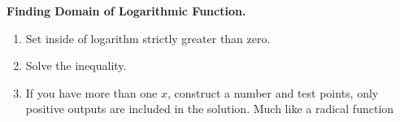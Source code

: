 \documentclass{report}
\begin{document}
      \bigbreak \noindent \bigbreak \noindent 
      \bigbreak \noindent 
      \bigbreak \noindent 

      \pagebreak \bigbreak \noindent
      \begin{mdframed}
        \textbf{Finding Domain of Logarithmic Function.}
        \begin{enumerate}
          \item Set inside of logarithm strictly greater than zero.
          \item Solve the inequality.
          \item If you have more than one $x$, construct a number and test points, only positive outputs are included in the solution. Much like a radical function
        \end{enumerate}
      \end{mdframed}
\end{document}
